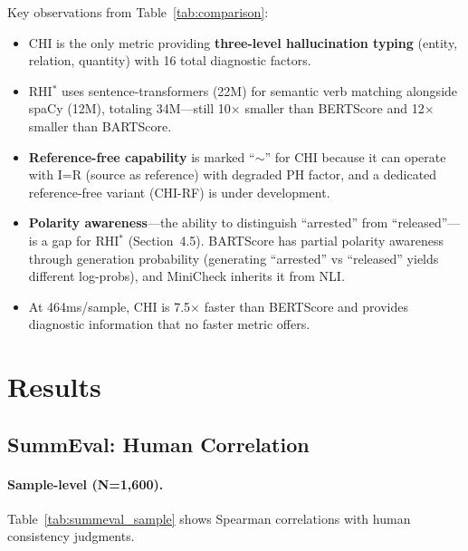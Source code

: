 \documentclass[11pt]{article}
\begin{document}
Key observations from Table~\ref{tab:comparison}:
\begin{itemize}
\item CHI is the only metric providing \textbf{three-level hallucination typing} (entity, relation, quantity) with 16 total diagnostic factors.
\item RHI$^*$ uses sentence-transformers (22M) for semantic verb matching alongside spaCy (12M), totaling 34M---still 10$\times$ smaller than BERTScore and 12$\times$ smaller than BARTScore.
\item \textbf{Reference-free capability} is marked ``$\sim$'' for CHI because it can operate with I=R (source as reference) with degraded PH factor, and a dedicated reference-free variant (CHI-RF) is under development.
\item \textbf{Polarity awareness}---the ability to distinguish ``arrested'' from ``released''---is a gap for RHI$^*$ (Section~4.5). BARTScore has partial polarity awareness through generation probability (generating ``arrested'' vs ``released'' yields different log-probs), and MiniCheck inherits it from NLI.
\item At 464ms/sample, CHI is 7.5$\times$ faster than BERTScore and provides diagnostic information that no faster metric offers.
\end{itemize}


\section{Results}

\subsection{SummEval: Human Correlation}

\paragraph{Sample-level (N=1,600).} Table~\ref{tab:summeval_sample} shows Spearman correlations with human consistency judgments.
\end{document}
